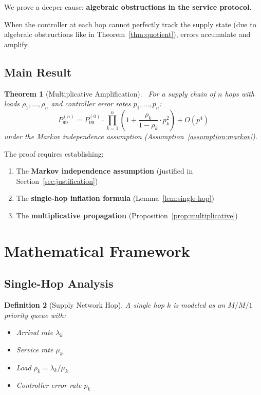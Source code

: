\documentclass[11pt]{article}
\newtheorem{theorem}{Theorem}[section]
\newtheorem{definition}[theorem]{Definition}
\begin{document}
We prove a deeper cause: \textbf{algebraic obstructions in the service protocol}.

When the controller at each hop cannot perfectly track the supply state (due to algebraic obstructions like in Theorem~\ref{thm:quotient}), errors accumulate and amplify.

\subsection{Main Result}

\begin{theorem}[Multiplicative Amplification]~\label{thm:main}
For a supply chain of $n$ hops with loads $\rho_1, \ldots, \rho_n$ and controller error rates $p_1, \ldots, p_n$:
$$P_{99}^{(n)} = P_{99}^{(0)} \cdot \prod_{k=1}^{n} \left(1 + \frac{\rho_k}{1-\rho_k} \cdot p_k^2\right) + O(p^4)$$
under the Markov independence assumption (Assumption~\ref{assumption:markov}).
\end{theorem}

The proof requires establishing:
\begin{enumerate}
    \item The \textbf{Markov independence assumption} (justified in Section~\ref{sec:justification})
    \item The \textbf{single-hop inflation formula} (Lemma~\ref{lem:single-hop})
    \item The \textbf{multiplicative propagation} (Proposition~\ref{prop:multiplicative})
\end{enumerate}

\section{Mathematical Framework}

\subsection{Single-Hop Analysis}

\begin{definition}[Supply Network Hop]
A single hop $k$ is modeled as an $M/M/1$ priority queue with:
\begin{itemize}
    \item Arrival rate $\lambda_k$
    \item Service rate $\mu_k$
    \item Load $\rho_k = \lambda_k / \mu_k$
    \item Controller error rate $p_k$
\end{itemize}
\end{definition}
\end{document}
